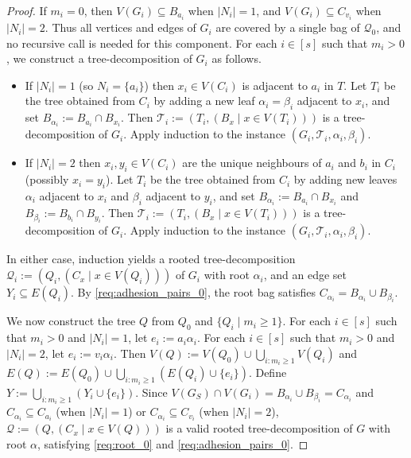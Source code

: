 \documentclass{patmorin}
\renewcommand{\ge}{\geqslant}
\renewcommand{\le}{\leqslant}
\newcommand{\calQ}{\mathcal{Q}}
\newcommand{\calT}{\mathcal{T}}
\begin{document}
\begin{proof}
  If $m_i=0$, then $V(G_i)\subseteq B_{a_i}$ when $|N_i|=1$, and $V(G_i)\subseteq C_{v_i}$ when $|N_i|=2$. Thus all vertices and edges of $G_i$ are covered by a single bag of $\calQ_0$, and no recursive call is needed for this component.  For each $i\in[s]$ such that $m_i>0$, we construct a tree-decomposition of $G_i$ as follows. 

  \begin{itemize}
    \item If $|N_i|=1$ (so $N_i=\{a_i\}$) then $x_i\in V(C_i)$ is adjacent to $a_i$ in $T$. Let $T_i$ be the tree obtained from $C_i$ by adding a new leaf $\alpha_i=\beta_i$ adjacent to $x_i$, and set $B_{\alpha_i}:=B_{a_i}\cap B_{x_i}$.  Then $\calT_i:=(T_i, (B_x\mid x\in V(T_i)))$ is a tree-decomposition of $G_i$.  Apply induction to the instance $(G_i,\calT_i,\alpha_i,\beta_i)$.
    \item If $|N_i|=2$ then $x_i,y_i\in V(C_i)$ are the unique neighbours of $a_i$ and $b_i$ in $C_i$ (possibly $x_i=y_i$). Let $T_i$ be the tree obtained from $C_i$ by adding new leaves $\alpha_i$ adjacent to $x_i$ and $\beta_i$ adjacent to $y_i$, and set $B_{\alpha_i}:=B_{a_i}\cap B_{x_i}$ and $B_{\beta_i}:=B_{b_i}\cap B_{y_i}$.  Then $\calT_i:=(T_i, (B_x\mid x\in V(T_i)))$ is a tree-decomposition of $G_i$.  Apply induction to the instance $(G_i,\calT_i,\alpha_i,\beta_i)$.
  \end{itemize}
  In either case, induction yields a rooted tree-decomposition $\calQ_i:=(Q_i,(C_x\mid x\in V(Q_i)))$ of $G_i$ with root $\alpha_i$, and an edge set $Y_i\subseteq E(Q_i)$.  By \ref{req:adhesion_pairs_0}, the root bag satisfies $C_{\alpha_i}=B_{\alpha_i}\cup B_{\beta_i}$.


  We now construct the tree $Q$ from $Q_0$ and $\{Q_i\mid m_i\ge 1\}$.   
  For each $i\in[s]$ such that $m_i>0$ and  $|N_i|=1$, let $e_i:=a_i\alpha_i$.
  For each $i\in[s]$ such that $m_i>0$ and $|N_i|=2$, let $e_i:=v_i\alpha_i$.
  Then $V(Q):=V(Q_0)\cup \bigcup_{i: m_i\ge 1} V(Q_i)$ and $E(Q):=E(Q_0)\cup \bigcup_{i: m_i\ge 1} (E(Q_i) \cup \{e_i\})$.  Define $Y := \bigcup_{i: m_i\ge 1} (Y_i \cup \{e_i\})$.  Since $V(G_S)\cap V(G_i)=B_{\alpha_i}\cup B_{\beta_i}=C_{\alpha_i}$ and $C_{\alpha_i}\subseteq C_{a_i}$ (when $|N_i|=1$) or $C_{\alpha_i}\subseteq C_{v_i}$ (when $|N_i|=2$), $\calQ:=(Q,(C_x\mid x\in V(Q)))$ is a valid rooted tree-decomposition of $G$ with root $\alpha$, satisfying \ref{req:root_0} and \ref{req:adhesion_pairs_0}.


\end{proof}
\end{document}
